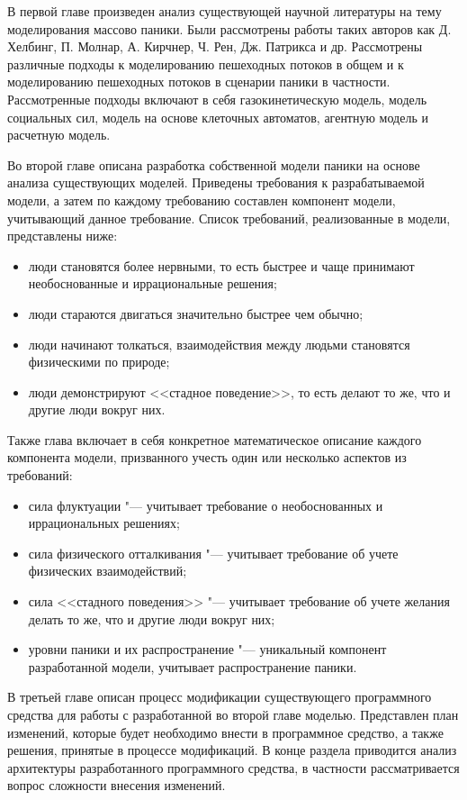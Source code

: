 В первой главе произведен анализ существующей научной литературы на тему моделирования массово паники.
Были рассмотрены работы таких авторов как Д. Хелбинг, П. Молнар, А. Кирчнер, Ч. Рен, Дж. Патрикса и др.
Рассмотрены различные подходы к моделированию пешеходных потоков в общем и к моделированию пешеходных
потоков в сценарии паники в частности. Рассмотренные подходы включают в себя газокинетическую модель,
модель социальных сил, модель на основе клеточных автоматов, агентную модель и расчетную модель.

Во второй главе описана разработка собственной модели паники на основе анализа существующих моделей.
Приведены требования к разрабатываемой модели, а затем по каждому требованию составлен компонент модели,
учитывающий данное требование. Список требований, реализованные в модели, представлены ниже:

\begin{itemize}
  \item люди становятся более нервными, то есть быстрее и чаще принимают необоснованные и иррациональные решения;
  \item люди стараются двигаться значительно быстрее чем обычно;
  \item люди начинают толкаться, взаимодействия между людьми становятся физическими по природе;
  \item люди демонстрируют <<стадное поведение>>, то есть делают то же, что и другие люди вокруг них.
\end{itemize}

Также глава включает в себя конкретное математическое описание каждого компонента модели, призванного учесть один или несколько аспектов из требований:
\begin{itemize}
  \item сила флуктуации "--- учитывает требование о необоснованных и иррациональных решениях;
  \item сила физического отталкивания "--- учитывает требование об учете физических взаимодействий;
  \item сила <<стадного поведения>> "--- учитывает требование об учете желания делать то же, что и другие люди вокруг них;
  \item уровни паники и их распространение "--- уникальный компонент разработанной модели, учитывает распространение паники.
\end{itemize}


В третьей главе описан процесс модификации существующего программного средства для работы с разработанной
во второй главе моделью. Представлен план изменений, которые будет необходимо внести в программное средство,
а также решения, принятые в процессе модификаций. В конце раздела приводится анализ архитектуры разработанного
программного средства, в частности рассматривается вопрос сложности внесения изменений.

